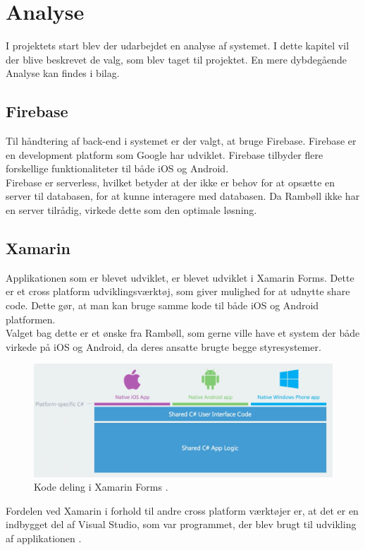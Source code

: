 \chapter{Analyse}
I projektets start blev der udarbejdet en analyse af systemet. I dette kapitel vil der blive beskrevet de valg, som blev taget til projektet. En mere dybdegående Analyse kan findes i bilag. \\

\section{Firebase}
	Til håndtering af back-end i systemet er der valgt, at bruge Firebase. Firebase\cite{Firebase} er en development platform som Google har udviklet. Firebase tilbyder flere forskellige funktionaliteter til både iOS og Android. \\
	Firebase er serverless, hvilket betyder at der ikke er behov for at opsætte en server til databasen, for at kunne interagere med databasen. Da Rambøll ikke har en server tilrådig, virkede dette som den optimale løsning. \\

\section{Xamarin}
	Applikationen som er blevet udviklet, er blevet udviklet i Xamarin Forms\cite{Xarmain}. Dette er et cross platform udviklingsværktøj, som giver mulighed for at udnytte share code. Dette gør, at man kan bruge samme kode til både iOS og Android platformen. \\
	Valget bag dette er et ønske fra Rambøll, som gerne ville have et system der både virkede på iOS og Android, da deres ansatte brugte begge styresystemer.
	
	\begin{figure}[H]
		\centering
		\includegraphics[width=1\linewidth]{Analyse/XarmarinShare}
		\caption{Kode deling i Xamarin Forms \cite{Xarmain}.}
		\label{fig:CodeShare}
	\end{figure}
	
	Fordelen ved Xamarin i forhold til andre cross platform værktøjer er, at det er en indbygget del af Visual Studio, som var programmet, der blev brugt til udvikling af applikationen \cite{VisualStudio}. \\
